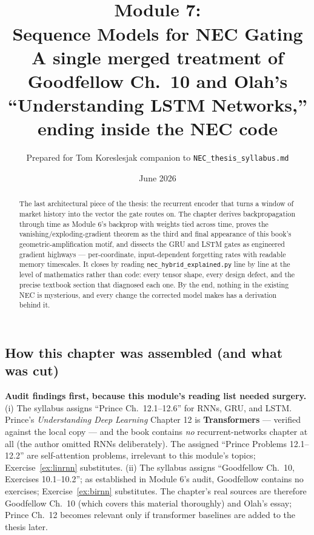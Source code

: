 \documentclass[11pt]{article}
\title{\vspace{-1.2em}{\large\sffamily Foundations for a Quant Research Pipeline}\\[0.4em]
\textbf{Module 7:\\ Sequence Models for NEC Gating}\\[0.3em]
{\large A single merged treatment of Goodfellow Ch.\ 10 and Olah's\\ ``Understanding LSTM Networks,'' ending inside the NEC code}}
\author{Prepared for Tom Koreslesjak \;\textperiodcentered\; companion to \texttt{NEC\_thesis\_syllabus.md}}
\date{June 2026}
\numberwithin{equation}{section}
\theoremstyle{plain}
\theoremstyle{definition}
\theoremstyle{remark}
\newcounter{exercise}
\begin{document}
\maketitle
\vspace{-1.5em}

\begin{abstract}
\noindent The last architectural piece of the thesis: the recurrent encoder that turns a window of market history into the vector the gate routes on. The chapter derives backpropagation through time as Module 6's backprop with weights tied across time, proves the vanishing/exploding-gradient theorem as the third and final appearance of this book's geometric-amplification motif, and dissects the GRU and LSTM gates as engineered gradient highways --- per-coordinate, input-dependent forgetting rates with readable memory timescales. It closes by reading \texttt{nec\_hybrid\_explained.py} line by line at the level of mathematics rather than code: every tensor shape, every design defect, and the precise textbook section that diagnosed each one. By the end, nothing in the existing NEC is mysterious, and every change the corrected model makes has a derivation behind it.
\end{abstract}

\tableofcontents

\subsection*{How this chapter was assembled (and what was cut)}

\textbf{Audit findings first, because this module's reading list needed surgery.} (i) The syllabus assigns ``Prince Ch.\ 12.1--12.6'' for RNNs, GRU, and LSTM. Prince's \emph{Understanding Deep Learning} Chapter 12 is \textbf{Transformers} --- verified against the local copy --- and the book contains \emph{no} recurrent-networks chapter at all (the author omitted RNNs deliberately). The assigned ``Prince Problems 12.1--12.2'' are self-attention problems, irrelevant to this module's topics; Exercise~\ref{ex:linrnn} substitutes. (ii) The syllabus assigns ``Goodfellow Ch.\ 10, Exercises 10.1--10.2''; as established in Module 6's audit, Goodfellow contains no exercises; Exercise~\ref{ex:birnn} substitutes. The chapter's real sources are therefore Goodfellow Ch.\ 10 (which covers this material thoroughly) and Olah's essay; Prince Ch.\ 12 becomes relevant only if transformer baselines are added to the thesis later.
\end{document}
